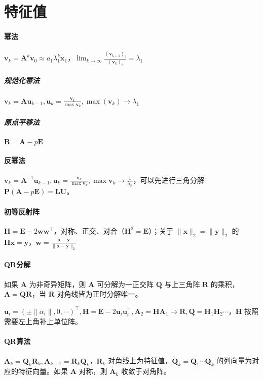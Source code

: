 \documentclass[twocolumn]{ctexart}
\begin{document}

\section{特征值}

\paragraph{幂法} $\mathbf{v}_{k}=\mathbf{A}^{k}\mathbf{v}_0\approx a_1\lambda_1^k\mathbf{x}_1$，$\lim_{k\rightarrow \infty}\frac{(\mathbf{v}_{k+1})_i}{(\mathbf{v}_k)_i}=\lambda_1$
\subparagraph{规范化幂法} $\mathbf{v}_k=\mathbf{A}\mathbf{u}_{k-1},\mathbf{u}_k=\frac{\mathbf{v}_k}{\max\mathbf{v}_k},\max(\mathbf{v}_k)\rightarrow \lambda_1$
\subparagraph{原点平移法} $\mathbf{B}=\mathbf{A}-p\mathbf{E}$

\paragraph{反幂法} $\mathbf{v}_k=\mathbf{A}^{-1}\mathbf{u}_{k-1},\mathbf{u}_k=\frac{\mathbf{v}_k}{\max\mathbf{v}_k},\max\mathbf{v}_k\rightarrow \frac{1}{\lambda_n}$，可以先进行三角分解 $\mathbf{P}(\mathbf{A}-p\mathbf{E})=\mathbf{L}\mathbf{U}$。

\paragraph{初等反射阵} $\mathbf{H}=\mathbf{E}-2\mathbf{w}\mathbf{w}^\top$，对称、正交、对合（$\mathbf{H}^2=\mathbf{E}$）；关于 $\lVert \mathbf{x}\rVert_2=\lVert \mathbf{y}\rVert_2$ 的 $\mathbf{H}\mathbf{x}=\mathbf{y}$，$\mathbf{w}=\frac{\mathbf{x}-\mathbf{y}}{\lVert \mathbf{x}-\mathbf{y}\rVert_2}$

\paragraph{QR分解} 如果 $\mathbf{A}$ 为非奇异矩阵，则 $\mathbf{A}$ 可分解为一正交阵 $\mathbf{Q}$ 与上三角阵 $\mathbf{R}$ 的乘积，$\mathbf{A}=\mathbf{Q}\mathbf{R}$，当 $\mathbf{R}$ 对角线皆为正时分解唯一。

$\mathbf{u}_i=(\pm\lVert\alpha_i\rVert,0,\cdots)^\top,\mathbf{H}=\mathbf{E}-2\mathbf{u}_i\mathbf{u}_i^\top,\mathbf{A}_2=\mathbf{H}\mathbf{A}_1\rightarrow\mathbf{R},\mathbf{Q}=\mathbf{H}_1\mathbf{H}_2\cdots$，$\mathbf{H}$ 按照需要左上角补上单位阵。

\paragraph{QR算法} $\mathbf{A}_k=\mathbf{Q}_k\mathbf{R}_k, \mathbf{A}_{k+1}=\mathbf{R}_k\mathbf{Q}_k$，$\mathbf{R}_k$ 对角线上为特征值，$\tilde{\mathbf{Q}}_k=\mathbf{Q}_1\cdots\mathbf{Q}_k$ 的列向量为对应的特征向量。如果 $\mathbf{A}$ 对称，则 $\mathbf{A}_k$ 收敛于对角阵。


\end{document}

